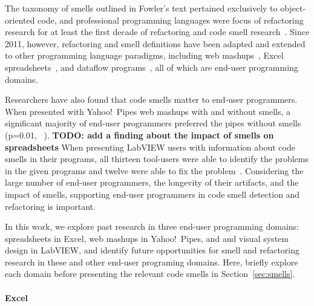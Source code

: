 \documentclass[10pt,conference,compsocconf]{IEEEtran}
\newcommand{\todo}[1]{\textbf{TODO: #1}}
\begin{document}
The taxonomy of smells outlined in Fowler's text pertained exclusively to object-oriented code, and professional programming languages were focus of refactoring research for at least the first decade of refactoring and code smell research~\cite{Mens:2004:SSR:972215.972286}.
Since 2011, however, refactoring and smell definitions have been adapted and extended to other 
programming language paradigms, including web mashups~\cite{Stolee2011, StoleeTSE2013}, Excel spreadsheets~\cite{Hermans2011, Hermans2012inter, hermans2014bumblebee}, and dataflow programs~\cite{chambers2013smell}, all of which are end-user programming domains. 

Researchers have also found that code smells matter to end-user programmers. When presented with Yahoo!\ Pipes web mashups with and without smells, a significant majority of end-user programmers preferred the pipes without smells (p=0.01, ~\cite{StoleeTSE2013}). 
\todo{add a finding about the impact of smells on spreadsheets} 
When presenting LabVIEW users with information about code smells in their programs, all thirteen tool-users were able to identify the problems in the given programs and twelve were able to fix the problem~\cite{chambers2013smell}.
Considering the large number of end-user programmers, the longevity of their artifacts, and the impact of smells, supporting end-user programmers in code smell detection and refactoring is important. 

In this work, we explore past research in three end-user programming domains: spreadsheets in Excel, web mashups in Yahoo!\ Pipes, and and visual system design in LabVIEW, and identify future opportunities for smell and refactoring research in these and other end-user programing domains. Here, briefly explore each domain  before presenting the relevant code smells in  Section~\ref{sec:smells}.

\paragraph{Excel}
\end{document}
